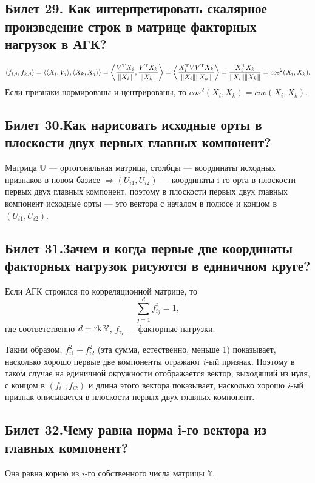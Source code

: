 \subsection{Билет 29. Как интерпретировать скалярное произведение строк в матрице факторных нагрузок в АГК?}
\begin{equation*}
\langle f_{i,j},f_{k,j} \rangle =
\langle \langle X_i,V_j\rangle,\langle X_k,X_j \rangle \rangle = 
\left\langle \frac{V^{\operatorname{T}} X_i}{\Vert X_i\Vert}, \frac{V^{\operatorname{T}} X_k}{\Vert X_k \Vert}\right\rangle =
\left\langle \frac{X_i^{\operatorname{T}} V V^{\operatorname{T}}X_k } {\Vert X_i\Vert \Vert X_k \Vert}\right\rangle = 
\frac{X_i^{\operatorname{T}} X_k}{\Vert X_i\Vert \Vert X_k \Vert}=cos^2(X_i,X_k) .
\end{equation*}
Если признаки нормированы и центрированы, то $cos^2(X_i,X_k)=cov(X_i,X_k)$.

\subsection{Билет 30.Как нарисовать исходные орты в плоскости двух первых главных компонент?}  
Матрица $\mathbb{U}$ --- ортогональная матрица, столбцы --- координаты исходных признаков в новом базисе $\Rightarrow (U_{i1},U_{i2})$ --- координаты i-го орта в плоскости первых двух главных компонент, поэтому в плоскости первых двух главных компонент исходные орты --- это вектора с началом в полюсе и концом в $(U_{i1},U_{i2})$. 

\subsection{Билет 31.Зачем и когда первые две координаты факторных нагрузок рисуются в единичном круге?}
Если АГК строился по корреляционной матрице, то 
\begin{equation}
\sum\limits_{j = 1}^{d} f^2_{ij} = 1, 
\end{equation}
где соответственно $d = \operatorname{rk} \mathbb{Y}$, $f_{ij}$ --- факторные нагрузки.

Таким образом, $f^2_{i1} + f^2_{i2}$ (эта сумма, естественно, меньше 1) показывает, насколько хорошо первые две компоненты отражают $i$-ый признак.
Поэтому в таком случае на единичной окружности отображается вектор, выходящий из нуля, с концом в $(f_{i1};f_{i2})$ и длина этого вектора показывает, насколько хорошо $i$-ый признак описывается в плоскости первых двух главных компонент.

\subsection{Билет 32.Чему равна норма i-го вектора из главных компонент?}
Она равна корню из $i$-го собственного числа матрицы $\mathbb{Y}$.


